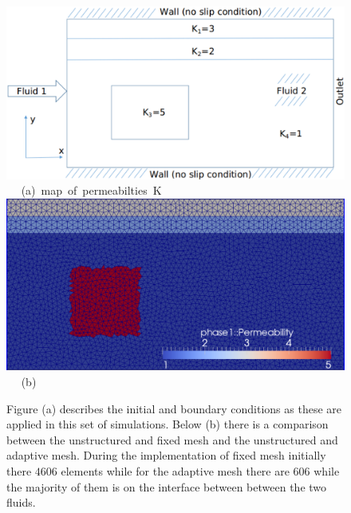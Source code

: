 \begin{landscape}
\begin{figure}[ht] 
\vbox{
\hbox{\hspace{4.0cm}
\includegraphics[width=.8\textwidth]{./Pics/map_of_boundaries.pdf} 
}
\vspace{0.0cm}
\hbox{\hspace{6.5cm} (a) map of permeabilties K   
}
\vspace{0.25cm}
\hbox{\hspace{4.0cm}
\includegraphics[width=.8\textwidth]{./Pics/4r_po_adapt_fine_125_mesh.pdf}
}
\vspace{0.0cm}
\hbox{\hspace{9cm} (b)      
}
}     
\caption{Figure (a) describes the initial and boundary conditions as these are applied in this set of simulations. Below (b) there is a comparison between the unstructured and fixed mesh and the unstructured and adaptive mesh. During the implementation of fixed mesh initially there $4606$ elements while for the adaptive mesh there are $606$ while the majority of them is on the interface between between the two fluids. }
\label{fig:testcase_heter_domain}
\end{figure}
\end{landscape}
\clearpage


